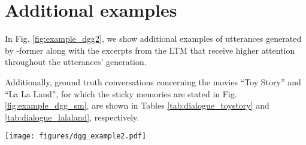 \documentclass[11pt]{article}
\begin{document}
\section{Additional examples}
\label{sec:examples}
In Fig. \ref{fig:example_dgg2}, we show additional examples of utterances generated by \mbox{-former} along with the excerpts from the LTM that receive higher attention throughout the utterances' generation.

Additionally, ground truth conversations concerning the movies ``Toy Story'' and ``La La Land'', for which the sticky memories are stated in Fig. \ref{fig:example_dgg_sm}, are shown in Tables \ref{tab:dialogue_toystory} and \ref{tab:dialogue_lalaland}, respectively.

\begin{figure*}[t]
  \centering
    \texttt{[image: figures/dgg\_example2.pdf]}
  \caption{Examples of answers generated by \mbox{-former} on a dialogue about the movie ``The Social Network''. The excerpts from the LTM that are more attended to throughout their generation are highlighted on each color correspondingly.}
  \label{fig:example_dgg2}
\end{figure*}
\end{document}
